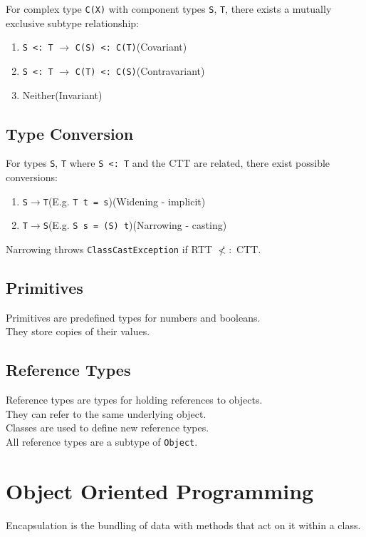 \documentclass[12pt, a4paper]{article}
\begin{document}
\begin{multicols*}{3}
For complex type \lstinline|C(X)| with component types \lstinline|S|, \lstinline|T|, there exists a mutually exclusive subtype relationship:
\begin{enumerate}[\roman*.]
  \item \lstinline|S <: T| $\rightarrow$ \lstinline|C(S) <: C(T)|\hfill(Covariant)
  \item \lstinline|S <: T| $\rightarrow$ \lstinline|C(T) <: C(S)|\hfill(Contravariant)
  \item Neither\hfill(Invariant)
\end{enumerate}

\subsection{Type Conversion}
For types \lstinline|S|, \lstinline|T| where \lstinline|S <: T| and the CTT are related, there exist possible conversions:
\begin{enumerate}[\roman*.]
  \item \lstinline|S|$\rightarrow$\lstinline|T|\quad(E.g. \lstinline|T t = s|)\hfill(Widening - implicit)
  \item \lstinline|T|$\rightarrow$\lstinline|S|\quad(E.g. \lstinline|S s = (S) t|)\hfill(Narrowing - casting)
\end{enumerate}

Narrowing throws \lstinline|ClassCastException| if RTT $\not<:$ CTT.

\subsection{Primitives}
Primitives are predefined types for numbers and booleans.\\They store copies of their values.

\subsection{Reference Types}
Reference types are types for holding references to objects.\\ They can refer to the same underlying object.\\Classes are used to define new reference types.\\All reference types are a subtype of \lstinline|Object|.

\colbreak
\section{Object Oriented Programming}
Encapsulation is the bundling of data with methods that act on it within a class.


\end{multicols*}
\end{document}
